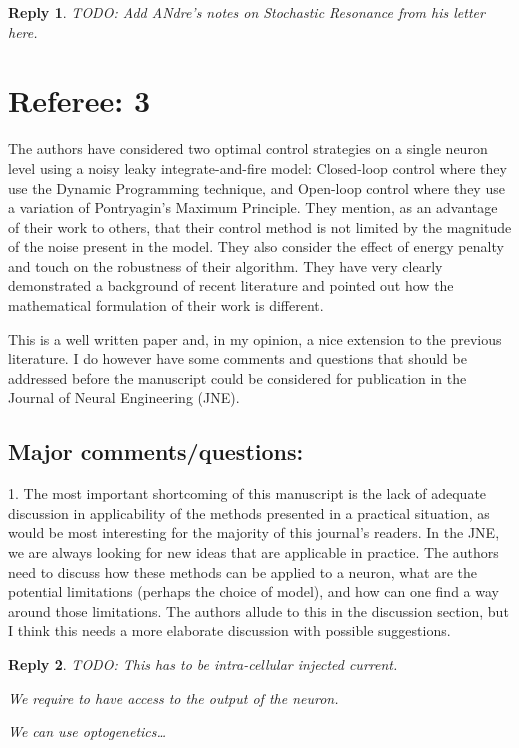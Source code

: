 \documentclass{article}
\newtheorem*{rep}{Reply}
\begin{document}
\begin{enumerate}
\begin{rep}
TODO: Add ANdre's notes on Stochastic Resonance from his letter here. 
\end{rep}

\end{enumerate}

\clearpage
\section{Referee: 3}
The authors have considered two optimal control strategies on a single neuron
level using a noisy leaky integrate-and-fire model: Closed-loop control where
they use the Dynamic Programming technique, and Open-loop control where they use
a variation of Pontryagin's  Maximum Principle. They mention, as an advantage of
their work to others, that their control method is not limited by the magnitude
of the noise present in the model. They also consider the effect of energy
penalty and touch on the robustness of their algorithm. They have very clearly
demonstrated a background of recent literature and pointed out how the
mathematical formulation of their work is different.


This is a well written paper and, in my opinion, a nice extension to the
previous literature. I do however have some comments and questions that should
be addressed before the manuscript could be considered for publication in the
Journal of Neural Engineering (JNE).


\subsection{Major comments/questions:}
1. The most important shortcoming of this manuscript is the lack of adequate
discussion in applicability of the methods presented in a practical situation,
as would be most interesting for the majority of this journal's readers. In the
JNE, we are always looking for new ideas that are applicable in practice. The
authors need to discuss how these methods can be applied to a neuron, what are
the potential limitations (perhaps the choice of model), and how can one find a
way around those limitations. The authors allude to this in the discussion
section, but I think this needs a more elaborate discussion with possible
suggestions.
\begin{rep}
TODO:
This has to be intra-cellular injected current.

We require to have access to the output of the neuron.

We can use optogenetics\ldots
\end{rep}
\end{document}
